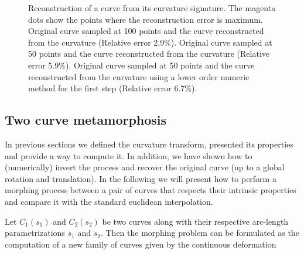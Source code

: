 \documentclass{ipol}
\newcommand{\chapFiveDir}{images/chapter_05a}
\renewcommand{\anchotres}{4.5cm}
\begin{document}
\begin{figure}[h]
	\centering

	\caption{Reconstruction of a curve from its curvature signature. The magenta dots show the points where the reconstruction error is maximum.
				\protect{} Original curve sampled at 100 points and the curve reconstructed  from the curvature (Relative error 2.9\%).
				\protect{} Original curve sampled at 50 points and the curve reconstructed from the curvature (Relative error 5.9\%).
			\protect{} Original curve sampled at 50 points and  the curve reconstructed from the curvature using a lower order numeric method for the first step (Relative error 6.7\%).}
	\label{fig:image_interpolation:curve_interpolation:reconstruction:sine}
\end{figure}

\subsection{Two curve metamorphosis}
In previous sections we defined the curvature transform, presented its properties and provide a way to compute it. In addition, we have shown how to (numerically) invert the process and recover the original curve (up to a global rotation and translation).
In the following we will present how to perform a morphing process between a pair of curves that respects their intrinsic properties and compare it with the standard euclidean interpolation.

Let $C_1(s_1)$ and $C_2(s_2)$ be two curves  along with their respective arc-length parametrizations $s_1$ and $s_2$. Then the morphing problem can be formulated as the computation of a new family of curves given by the continuous deformation 
\end{document}
